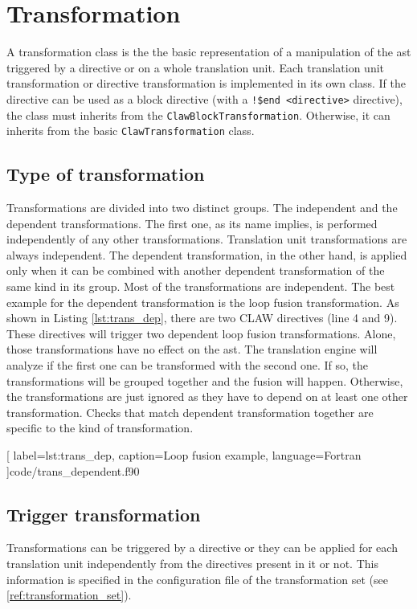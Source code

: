 \chapter{Transformation}
\label{chapter:transformation}
A transformation class is the the basic representation of a manipulation of the
\gls{ast} triggered by a directive or on a whole translation unit. Each 
translation unit transformation or directive transformation is implemented in
its own class. If the directive can be used as a block directive (with a
\lstinline|!$end <directive>| directive), the class must inherits from the
\lstinline!ClawBlockTransformation!. Otherwise, it can inherits from the basic
\lstinline!ClawTransformation! class.

\section{Type of transformation}
\label{section:trans_type}
Transformations are divided into two distinct groups. The independent and the
dependent transformations. The first one, as its name implies, is performed
independently of any other transformations. Translation unit transformations 
are always independent. The dependent transformation, in the
other hand, is applied only when it can be combined with another dependent
transformation of the same kind in its group. Most of the transformations are
independent. The best example for the dependent transformation is the loop
fusion transformation. As shown in Listing \ref{lst:trans_dep}, there are two
CLAW directives (line 4 and 9). These directives will trigger two dependent loop
fusion transformations. Alone, those transformations have no effect
on the \gls{ast}. The translation engine will analyze if the
first one can be transformed with the second one. If so, the transformations will
be grouped together and the fusion will happen. Otherwise, the transformations
are just ignored as they have to depend on at least one other transformation. 
Checks that match dependent transformation together are specific to the kind
of transformation.


  [
    label=lst:trans_dep,
    caption=Loop fusion example,
    language=Fortran
  ]{code/trans_dependent.f90}

\section{Trigger transformation}
\label{section:trans_trigger}
Transformations can be triggered by a directive or they can be applied for each
translation unit independently from the directives present in it or not.
This information is specified in the configuration file of the transformation
set (see \ref{ref:transformation_set}).



